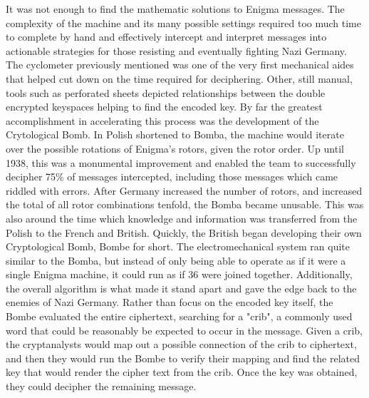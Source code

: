 It was not enough to find the mathematic solutions to Enigma messages. The complexity of the machine and its many possible settings required too much time to complete by hand and effectively intercept and interpret messages into actionable strategies for those resisting and eventually fighting Nazi Germany. The cyclometer previously mentioned was one of the very first mechanical aides that helped cut down on the time required for deciphering. Other, still manual, tools such as perforated sheets depicted relationships between the double encrypted keyspaces helping to find the encoded key. By far the greatest accomplishment in accelerating this process was the development of the Crytological Bomb. In Polish shortened to Bomba, the machine would iterate over the possible rotations of Enigma's rotors, given the rotor order. Up until 1938, this was a monumental improvement and enabled the team to successfully decipher 75\% of messages intercepted, including those messages which came riddled with errors. After Germany increased the number of rotors, and increased the total of all rotor combinations tenfold, the Bomba became unusable. This was also around the time which knowledge and information was transferred from the Polish to the French and British. Quickly, the British began developing their own Cryptological Bomb, Bombe for short. The electromechanical system ran quite similar to the Bomba, but instead of only being able to operate as if it were a single Enigma machine, it could run as if 36 were joined together. Additionally, the overall algorithm is what made it stand apart and gave the edge back to the enemies of Nazi Germany. Rather than focus on the encoded key itself, the Bombe evaluated the entire ciphertext, searching for a "crib", a commonly used word that could be reasonably be expected to occur in the message. Given a crib, the cryptanalysts would map out a possible connection of the crib to ciphertext, and then they would run the Bombe to verify their mapping and find the related key that would render the cipher text from the crib. Once the key was obtained, they could decipher the remaining message.
